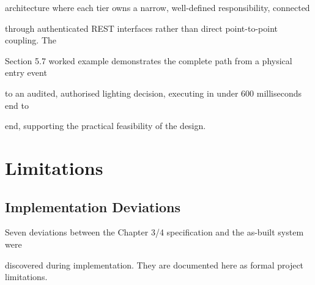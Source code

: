 architecture where each tier owns a narrow, well-defined responsibility, connected

through authenticated REST interfaces rather than direct point-to-point coupling. The

Section 5.7 worked example demonstrates the complete path from a physical entry event

to an audited, authorised lighting decision, executing in under 600 milliseconds end to

end, supporting the practical feasibility of the design.


\section{Limitations}

\subsection{Implementation Deviations}
Seven deviations between the Chapter 3/4 specification and the as-built system were

discovered during implementation. They are documented here as formal project limitations.

